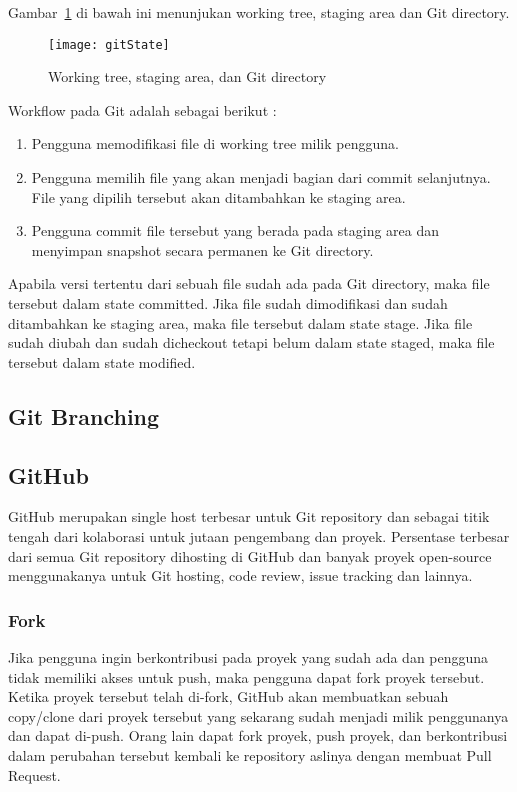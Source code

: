 Gambar~\ref{fig:gitState} di bawah ini menunjukan working tree, staging area dan Git directory.

\begin{figure}[H]
	\centering  
	\texttt{[image: gitState]}  
	\caption[Working tree, staging area, dan Git directory]{Working tree, staging area, dan Git directory}
	\label{fig:gitState} 
\end{figure}

Workflow pada Git adalah sebagai berikut :

\begin{enumerate}
	\item Pengguna memodifikasi file di working tree milik pengguna.
	\item Pengguna memilih file yang akan menjadi bagian dari commit selanjutnya. File yang dipilih tersebut akan ditambahkan ke staging area. 
	\item Pengguna commit file tersebut yang berada pada staging area dan menyimpan snapshot secara permanen ke Git directory.
\end{enumerate}

Apabila versi tertentu dari sebuah file sudah ada pada Git directory, maka file tersebut dalam state committed. Jika file sudah dimodifikasi dan sudah ditambahkan ke staging area, maka file tersebut dalam state stage. Jika file sudah diubah dan sudah dicheckout tetapi belum dalam state staged, maka file tersebut dalam state modified.


\subsection{Git Branching}

\subsection{GitHub}
GitHub merupakan single host terbesar untuk Git repository dan sebagai titik tengah dari kolaborasi untuk jutaan pengembang dan proyek. Persentase terbesar dari semua Git repository dihosting di GitHub dan banyak proyek open-source menggunakanya untuk Git hosting, code review, issue tracking dan lainnya. 

\subsubsection{Fork}
Jika pengguna ingin berkontribusi pada proyek yang sudah ada dan pengguna tidak memiliki akses untuk push, maka pengguna dapat fork proyek tersebut. Ketika proyek tersebut telah di-fork, GitHub akan membuatkan sebuah copy/clone dari proyek tersebut yang sekarang sudah menjadi milik penggunanya dan dapat di-push. Orang lain dapat fork proyek, push proyek, dan berkontribusi dalam perubahan tersebut kembali ke repository aslinya dengan membuat Pull Request.\\

